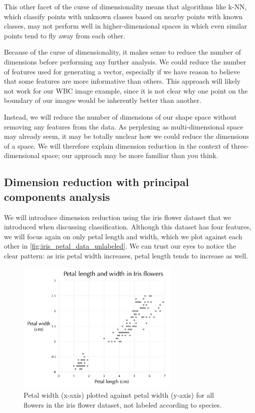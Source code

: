 This other facet of the curse of dimensionality means that algorithms like k-NN, which classify points with unknown classes based on nearby points with known classes, may not perform well in higher-dimensional spaces in which even similar points tend to fly away from each other.

Because of the curse of dimensionality, it makes sense to reduce the number of dimensions before performing any further analysis. We could reduce the number of features used for generating a vector, especially if we have reason to believe that some features are more informative than others. This approach will likely not work for our WBC image example, since it is not clear why one point on the boundary of our images would be inherently better than another.

Instead, we will reduce the number of dimensions of our shape space without removing any features from the data. As perplexing as multi-dimensional space may already seem, it may be totally unclear how we could reduce the dimensions of a space. We will therefore explain dimension reduction in the context of three-dimensional space; our approach may be more familiar than you think.

\FloatBarrier
{}
\subsection{Dimension reduction with principal components analysis}

We will introduce dimension reduction using the iris flower dataset that we introduced when discussing classification. Although this dataset has four features, we will focus again on only petal length and width, which we plot against each other in \autoref{fig:iris_petal_data_unlabeled}. We can trust our eyes to notice the clear pattern: as iris petal width increases, petal length tends to increase as well.

\begin{figure}[h]
\centering
\mySfFamily
\includegraphics[width = 0.7\textwidth]{../images/iris_petal_data_unlabeled.png}
\caption{Petal width (x-axis) plotted against petal width (y-axis) for all flowers in the iris flower dataset, not labeled according to species.}
\label{fig:iris_petal_data_unlabeled}
\end{figure}

